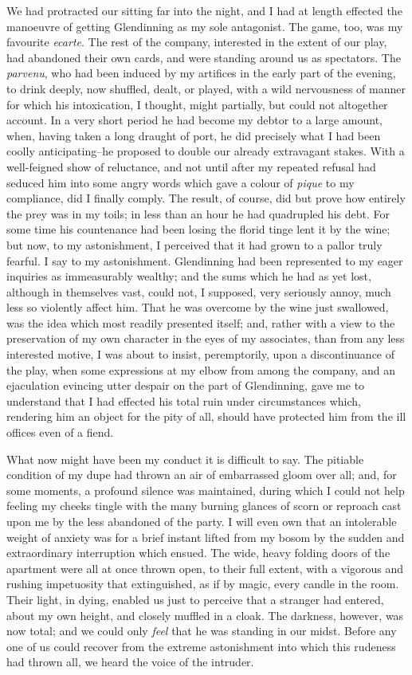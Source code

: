 \documentclass[12pt]{book}
\begin{document}
     We had protracted our sitting far into the night, and I had at
length effected the manoeuvre of getting Glendinning as my sole
antagonist.  The game, too, was my favourite \emph{ecarte}.  The rest
of the company, interested in the extent of our play, had abandoned
their own cards, and were standing around us as spectators.  The 
\emph{parvenu}, who had been induced by my artifices in the early part of
the evening, to drink deeply, now shuffled, dealt, or played, with
a wild nervousness of manner for which his intoxication, I thought,
might partially, but could not altogether account.  In a very short
period he had become my debtor to a large amount, when, having
taken a long draught of port, he did precisely what I had been
coolly anticipating--he proposed to double our already extravagant
stakes.  With a well-feigned show of reluctance, and not until
after my repeated refusal had seduced him into some angry words
which gave a colour of \emph{pique} to my compliance, did I finally
comply.  The result, of course, did but prove how entirely the prey
was in my toils; in less than an hour he had quadrupled his debt. 
For some time his countenance had been losing the florid tinge lent
it by the wine; but now, to my astonishment, I perceived that 
it had grown to a pallor truly fearful.  I say to my
astonishment.  Glendinning had been represented to my eager
inquiries as immeasurably wealthy; and the sums which he had as yet
lost, although in themselves vast, could not, I supposed, very
seriously annoy, much less so violently affect him.  That he was
overcome by the wine just swallowed, was the idea which most
readily presented itself; and, rather with a view to the
preservation of my own character in the eyes of my associates, than
from any less interested motive, I was about to insist,
peremptorily, upon a discontinuance of the play, when some
expressions at my elbow from among the company, and an ejaculation
evincing utter despair on the part of Glendinning, gave me to
understand that I had effected his total ruin under circumstances
which, rendering him an object for the pity of all, should have
protected him from the ill offices even of a fiend.

     What now might have been my conduct it is difficult to say. 
The pitiable condition of my dupe had thrown an air of embarrassed
gloom over all; and, for some moments, a profound silence was
maintained, during which I could not help feeling my cheeks tingle
with the many burning glances of scorn or reproach cast upon me by
the less abandoned of the party.  I will even own that an
intolerable weight of anxiety was for a brief instant lifted from
my bosom by the sudden and extraordinary interruption which ensued. 
The wide, heavy folding doors of the apartment were all at once
thrown open, to their full extent, with a vigorous and rushing
impetuosity that extinguished, as if by magic, every candle in the
room.  Their light, in dying, enabled us just to perceive that a
stranger had entered, about my own height, and closely muffled in
a cloak.  The darkness, however, was now total; and we could only
\emph{feel} that he was standing in our midst.  Before any one of us
could recover from the extreme astonishment into which this
rudeness had thrown all, we heard the voice of the intruder.
\end{document}
